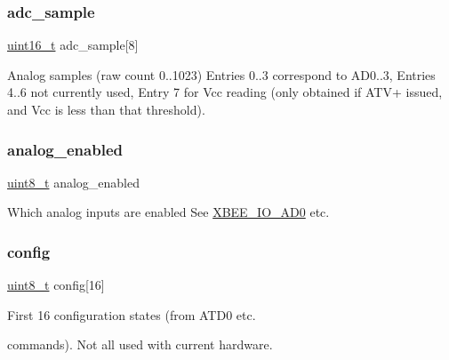 \subsubsection{\texorpdfstring{adc\+\_\+sample}{adc\_sample}}
{\footnotesize\ttfamily \hyperlink{group__hal__dos_ga5a8b2dc9e45a9ee81a94ef304fb62505}{uint16\+\_\+t} adc\+\_\+sample\mbox{[}8\mbox{]}}



Analog samples (raw count 0..1023) Entries 0..3 correspond to A\+D0..3, Entries 4..6 not currently used, Entry 7 for Vcc reading (only obtained if A\+T\+V+ issued, and Vcc is less than that threshold). 

\mbox{\label{group__xbee__io_ga8473837f97f54ee29f09cd8f9c15e084}} 
\subsubsection{\texorpdfstring{analog\+\_\+enabled}{analog\_enabled}}
{\footnotesize\ttfamily \hyperlink{group__hal__dos_gae1affc9ca37cfb624959c866a73f83c2}{uint8\+\_\+t} analog\+\_\+enabled}



Which analog inputs are enabled See \hyperlink{group__xbee__io_gafc56816e62b0dd0a8d981b08f5f29651}{X\+B\+E\+E\+\_\+\+I\+O\+\_\+\+A\+D0} etc. 

\mbox{\label{group__xbee__io_ga46d8dea1f8c2a731faf0db27d6ed308f}} 
\subsubsection{\texorpdfstring{config}{config}}
{\footnotesize\ttfamily \hyperlink{group__hal__dos_gae1affc9ca37cfb624959c866a73f83c2}{uint8\+\_\+t} config\mbox{[}16\mbox{]}}



First 16 configuration states (from A\+T\+D0 etc. 

commands). Not all used with current hardware. \mbox{\label{group__xbee__io_gabf150485c21c63b46d511cb50b2bf2df}} 
